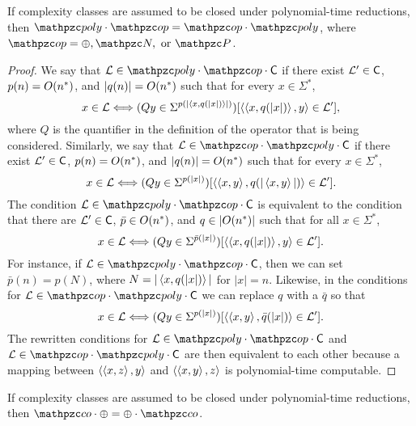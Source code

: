\begin{proposition}
If complexity classes are assumed to be closed under polynomial-time reductions, then
$\cpoly\cdot\op=\op\cdot\cpoly$, where $\op=\oplus,\cN,\text{ or }\cP$.
\end{proposition}

\begin{proof}
We say that $\cL\in\cpoly\cdot\op\cdot\sC$ if there exist $\mathcal{L}^\prime\in\mathsf{C}$,
$p(n)=O(n^*)$, and $|q(n)|=O(n^*)$ such that for every $x\in\Sigma^*$,
\[
x\in\mathcal{L}\Longleftrightarrow
(Qy\in\Sigma^{p(|\left\langle x,q(|x|)\right\rangle|)})[\left\langle\left\langle x,q(|x|)\right\rangle,y\right\rangle\in\mathcal{L}^\prime],
\]
where $Q$ is the quantifier in the definition of the operator that is being
considered. Similarly, we say that $\cL\in\op\cdot\cpoly\cdot\sC$ if there exist
$\mathcal{L}^\prime\in\mathsf{C}$, $p(n)=O(n^*)$, and $|q(n)|=O(n^*)$ such that for every
$x\in\Sigma^*$,
\[
x\in\mathcal{L}\Longleftrightarrow
(Qy\in\Sigma^{p(|x|)})[\left\langle\left\langle x,y\right\rangle,q(|\left\langle x,y\right\rangle|)\right\rangle\in\mathcal{L}^\prime].
\]
The condition $\cL\in\cpoly\cdot\op\cdot\sC$ is equivalent to the condition that
there are $\mathcal{L}^\prime\in\mathsf{C}$, $\bar p\in O(n^*)$, and $q\in|O(n^*)|$ such
that for all $x\in\Sigma^*$,
\[
x\in\mathcal{L}\Longleftrightarrow
(Qy\in\Sigma^{\bar p(|x|)})[\left\langle\left\langle x,q(|x|)\right\rangle,y\right\rangle\in\mathcal{L}^\prime].
\]
For instance, if $\cL\in\cpoly\cdot\op\cdot\sC$, then we can set $\bar
p(n)=p(N)$, where $N=|\left\langle x,q(|x|)\right\rangle|$ for $|x|=n$. Likewise, in the
conditions for $\cL\in\op\cdot\cpoly\cdot\sC$ we can replace $q$ with a $\bar q$
so that
\[
x\in\mathcal{L}\Longleftrightarrow
(Qy\in\Sigma^{p(|x|)})[\left\langle\left\langle x,y\right\rangle,\bar q(|x|)\right\rangle\in\mathcal{L}^\prime].
\]
The rewritten conditions for $\cL\in\cpoly\cdot\op\cdot\sC$ and
$\cL\in\op\cdot\cpoly\cdot\sC$ are then equivalent to each other because a
mapping between $\left\langle\left\langle x,z\right\rangle,y\right\rangle$ and $\left\langle\left\langle x,y\right\rangle,z\right\rangle$ is
polynomial-time computable.
\end{proof}

\begin{proposition}
If complexity classes are assumed to be closed under polynomial-time reductions, then
$\cco\cdot\oplus=\oplus\cdot\cco$.
\end{proposition}

